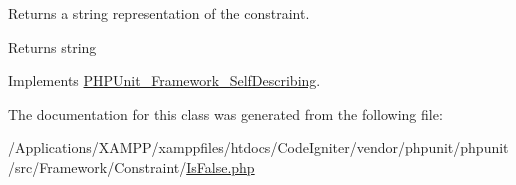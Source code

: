 Returns a string representation of the constraint.

\begin{DoxyReturn}{Returns}
string 
\end{DoxyReturn}


Implements \mbox{\hyperlink{interface_p_h_p_unit___framework___self_describing_a5558c5d549f41597377fa1ea8a1cefa3}{P\+H\+P\+Unit\+\_\+\+Framework\+\_\+\+Self\+Describing}}.



The documentation for this class was generated from the following file\+:\begin{DoxyCompactItemize}
\item 
/\+Applications/\+X\+A\+M\+P\+P/xamppfiles/htdocs/\+Code\+Igniter/vendor/phpunit/phpunit/src/\+Framework/\+Constraint/\mbox{\hyperlink{_is_false_8php}{Is\+False.\+php}}\end{DoxyCompactItemize}
